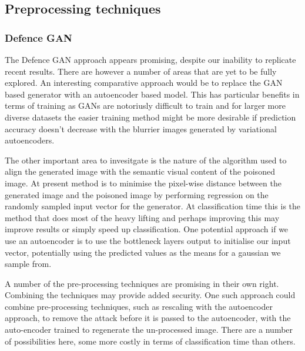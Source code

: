 \subsection{Preprocessing techniques}

\subsubsection{Defence GAN}
The Defence GAN approach appears promising, despite our inability to replicate recent results.  There are however a number of areas that are yet to be fully explored.  An interesting comparative approach would be to replace the GAN based generator with an autoencoder based model.  This has particular benefits in terms of training as GANs are notoriusly difficult to train and for larger more diverse datasets the easier training method might be more desirable if prediction accuracy doesn't decrease with the blurrier images generated by variational autoencoders.

The other important area to invesitgate is the nature of the algorithm used to align the generated image with the semantic visual content of the poisoned image.  At present method is to minimise the pixel-wise distance between the generated image and the poisoned image by performing regression on the randomly sampled input vector for the generator.  At classification time this is the method that does most of the heavy lifting and perhaps improving this may improve results or simply speed up classification.  One potential approach if we use an autoencoder is to use the bottleneck layers output to initialise our input vector, potentially using the predicted values as the means for a gaussian we sample from.

A number of the pre-processing techniques are promising in their own right. Combining the techniques may provide added security.  One such approach could combine pre-processing techniques, such as rescaling with the autoencoder approach, to remove the attack before it is passed to the autoencoder, with the auto-encoder trained to regenerate the un-processed image.  There are a number of possibilities here, some more costly in terms of classification time than others.